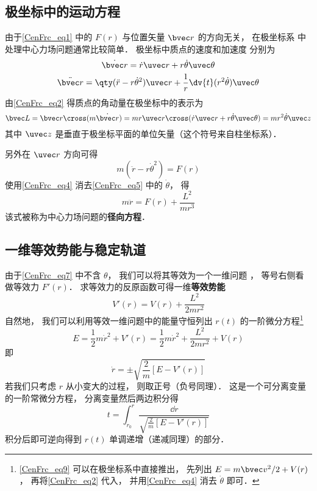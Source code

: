 \subsection{极坐标中的运动方程}
由于\autoref{CenFrc_eq1} 中的 $F(r)$ 与位置矢量 $\bvec r$ 的方向无关， 在极坐标系 中处理中心力场问题通常比较简单． 极坐标中质点的速度和加速度 分别为
\begin{equation}\label{CenFrc_eq2}
\dot{\bvec r} = \dot r \uvec r + r\dot\theta\uvec\theta
\end{equation}
\begin{equation}\label{CenFrc_eq3}
\ddot{\bvec r} = \qty(\ddot{r} - r \dot\theta^2)\uvec r + \frac 1r \dv{t} (r^2\dot\theta)\uvec \theta
\end{equation}
由\autoref{CenFrc_eq2} 得质点的角动量在极坐标中的表示为
\begin{equation}\label{CenFrc_eq4}
\bvec L = \bvec r \cross (m \dot{\bvec r})
= mr \uvec r \cross (\dot r \uvec r + r\dot\theta \uvec\theta)
= mr^2\dot \theta \uvec z
\end{equation}
其中 $\uvec z$ 是垂直于极坐标平面的单位矢量（这个符号来自柱坐标系）． 

另外在 $\uvec r$ 方向可得
\begin{equation}\label{CenFrc_eq5}
m(\ddot{r} - r \dot\theta^2) = F(r)
\end{equation}
使用\autoref{CenFrc_eq4} 消去\autoref{CenFrc_eq5} 中的 $\dot\theta$， 得
\begin{equation}\label{CenFrc_eq7}
m\ddot r = F(r) + \frac{L^2}{mr^3}
\end{equation}
该式被称为中心力场问题的\textbf{径向方程}．

\subsection{一维等效势能与稳定轨道}
由于\autoref{CenFrc_eq7} 中不含 $\theta$， 我们可以将其等效为一个一维问题%
， 等号右侧看做等效力 $F'(r)$． 求等效力的反原函数可得一维\textbf{等效势能}
\begin{equation}\label{CenFrc_eq6}
V'(r) = V(r) + \frac{L^2}{2mr^2}
\end{equation}
自然地， 我们可以利用等效一维问题中的能量守恒列出 $r(t)$ 的一阶微分方程\footnote{\autoref{CenFrc_eq9} 可以在极坐标系中直接推出， 先列出 $E = m\bvec v^2/2 + V(r)$， 再将\autoref{CenFrc_eq2} 代入， 并用\autoref{CenFrc_eq4} 消去 $\dot\theta$ 即可．}
\begin{equation}\label{CenFrc_eq9}
E = \frac 12 m\dot r^2 + V'(r) = \frac 12 m\dot r^2 + \frac{L^2}{2mr^2} + V(r)
\end{equation}
即
\begin{equation}\label{CenFrc_eq10}
\dot r = \pm\sqrt{\frac 2m [E - V'(r)]}
\end{equation}
若我们只考虑 $r$ 从小变大的过程， 则取正号（负号同理）． 这是一个可分离变量的一阶常微分方程， %
分离变量然后两边积分得
\begin{equation}\label{CenFrc_eq8}
t = \int_{r_0}^{r} \frac{\dd{r}}{\sqrt{\frac 2m [E - V'(r)]}}
\end{equation}
积分后即可逆向得到 $r(t)$ 单调递增（递减同理）的部分．

